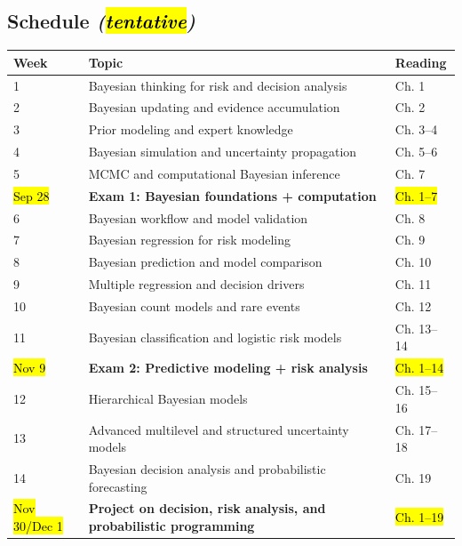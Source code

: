 \documentclass[10pt]{article}
\renewcommand{\arraystretch}{.9}
\begin{document}
\subsection*{Schedule \emph{(\hl{tentative})}}
\renewcommand{\arraystretch}{1.025}
\begin{tabular}{l l l}
\hline
\textbf{Week}     & \textbf{Topic}                                                        & \textbf{Reading} \\ \hline
1                 & Bayesian thinking for risk and decision analysis                      & Ch. 1            \\ \hline
2                 & Bayesian updating and evidence accumulation                           & Ch. 2            \\ \hline
3                 & Prior modeling and expert knowledge                                   & Ch. 3--4         \\ \hline
4                 & Bayesian simulation and uncertainty propagation                       & Ch. 5--6         \\ \hline
5                 & MCMC and computational Bayesian inference                             & Ch. 7            \\ \hline
\hl{Sep 28}       & \textbf{Exam 1: Bayesian foundations + computation}                   & \hl{Ch. 1--7}    \\ \hline
6                 & Bayesian workflow and model validation                                & Ch. 8            \\ \hline
7                 & Bayesian regression for risk modeling                                 & Ch. 9            \\ \hline
8                 & Bayesian prediction and model comparison                              & Ch. 10           \\ \hline
9                 & Multiple regression and decision drivers                              & Ch. 11           \\ \hline
10                & Bayesian count models and rare events                                 & Ch. 12           \\ \hline
11                & Bayesian classification and logistic risk models                      & Ch. 13--14       \\ \hline
\hl{Nov 9}        & \textbf{Exam 2: Predictive modeling + risk analysis}                  & \hl{Ch. 1--14}   \\ \hline
12                & Hierarchical Bayesian models                                          & Ch. 15--16       \\ \hline
13                & Advanced multilevel and structured uncertainty models                 & Ch. 17--18       \\ \hline
14                & Bayesian decision analysis and probabilistic forecasting              & Ch. 19           \\ \hline
\hl{Nov 30/Dec 1} & \textbf{Project on decision, risk analysis, and probabilistic programming} & \hl{Ch. 1--19}   \\
\hline
\end{tabular}
\end{document}
